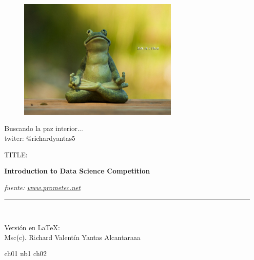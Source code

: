 \documentclass[a4paper,12pt]{book}
\begin{document}
    \begin{titlepage}
        \begin{center}
        \vspace*{-1in}
            \begin{figure}[htb]
            \begin{center}
                \includegraphics[width=8cm]{zen_as_a_frog.jpg}
            \end{center}
            \end{figure}

            Buscando la paz interior...\\
            \vspace*{0.15in}
            twiter: @richardyantas5\\
            \vspace*{0.6in}
            \begin{large}
            TITLE:\\
            \end{large}
            \vspace*{0.2in}
            \begin{Large}
            \textbf{Introduction to Data Science Competition} \\
            \end{Large}
            \vspace*{0.3in}
            \begin{large}
            \textit{fuente: \href{http://www.prometec.net}{www.prometec.net}}\\
            \end{large}
            \vspace*{0.3in}
            \rule{80mm}{0.1mm}\\
            \vspace*{0.1in}
            \begin{large}
            Versión en \LaTeX: \\
            Msc(c). Richard Valent\'in Yantas Alcantaraaa\\
            \end{large}
        \end{center}

    \end{titlepage}

    \newpage
    \tableofcontents
    \newpage
    \clearpage 
    {ch01} 
    {nb1}
    {ch02} 
    \newpage
\end{document}
